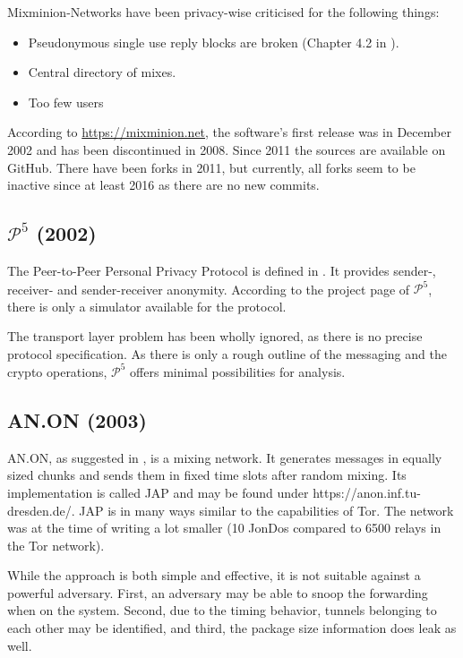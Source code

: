 Mixminion-Networks have been privacy-wise criticised for the following things: 
\begin{itemize}
	\item Pseudonymous single use reply blocks are broken (Chapter 4.2 in \cite{sassamanpynchon}).
	\item Central directory of mixes.
	\item Too few users
\end{itemize}

According to \url{https://mixminion.net}, the software's first release was in December 2002 and has been discontinued in 2008. Since 2011 the sources are available on GitHub. There have been forks in 2011, but currently, all forks seem to be inactive since at least 2016 as there are no new commits.

\subsection{\texorpdfstring{$\mathcal{P}^5$}{P5} (2002)}
The Peer-to-Peer Personal Privacy Protocol is defined in \cite{sherwood-protocol}. It provides sender-, receiver- and sender-receiver anonymity. According to the project page of $\mathcal{P}^5$, there is only a simulator available for the protocol.

The transport layer problem has been wholly ignored, as there is no precise protocol specification. As there is only a rough outline of the messaging and the crypto operations, $\mathcal{P}^5$ offers minimal possibilities for analysis.

\subsection{AN.ON (2003)}
AN.ON, as suggested in \cite{federrath2003system}, is a mixing network. It generates messages in equally sized chunks and sends them in fixed time slots after random mixing. Its implementation is called JAP and may be found under https://anon.inf.tu-dresden.de/. JAP is in many ways similar to the capabilities of Tor. The network was at the time of writing a lot smaller (10 JonDos compared to 6500 relays in the Tor network).

While the approach is both simple and effective, it is not suitable against a powerful adversary. First, an adversary may be able to snoop the forwarding when on the system. Second, due to the timing behavior, tunnels belonging to each other may be identified, and third, the package size information does leak as well.

